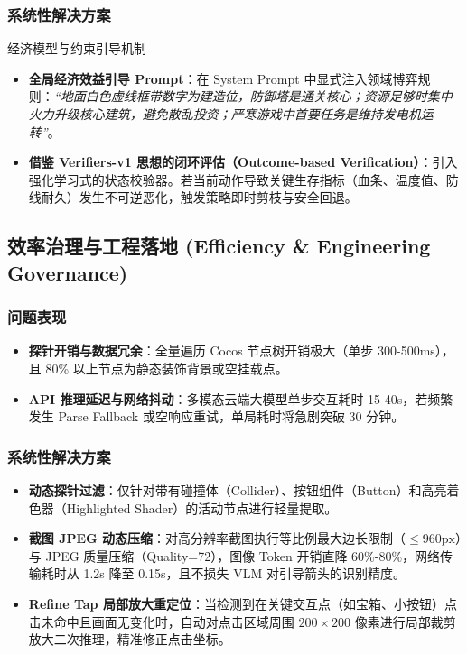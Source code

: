 \documentclass[11pt,a4paper]{ctexart}
\begin{document}
\subsubsection{系统性解决方案}
\begin{conceptbox}{经济模型与约束引导机制}
\begin{itemize}
  \item \textbf{全局经济效益引导 Prompt}：在 System Prompt 中显式注入领域博弈规则：\textit{“地面白色虚线框带数字为建造位，防御塔是通关核心；资源足够时集中火力升级核心建筑，避免散乱投资；严寒游戏中首要任务是维持发电机运转”}。
  \item \textbf{借鉴 Verifiers-v1 思想的闭环评估（Outcome-based Verification）}：引入强化学习式的状态校验器。若当前动作导致关键生存指标（血条、温度值、防线耐久）发生不可逆恶化，触发策略即时剪枝与安全回退。
\end{itemize}
\end{conceptbox}

\subsection{效率治理与工程落地 (Efficiency \& Engineering Governance)}

\subsubsection{问题表现}
\begin{itemize}
  \item \textbf{探针开销与数据冗余}：全量遍历 Cocos 节点树开销极大（单步 300-500ms），且 80\% 以上节点为静态装饰背景或空挂载点。
  \item \textbf{API 推理延迟与网络抖动}：多模态云端大模型单步交互耗时 15-40s，若频繁发生 Parse Fallback 或空响应重试，单局耗时将急剧突破 30 分钟。
\end{itemize}

\subsubsection{系统性解决方案}
\begin{itemize}
  \item \textbf{动态探针过滤}：仅针对带有碰撞体（Collider）、按钮组件（Button）和高亮着色器（Highlighted Shader）的活动节点进行轻量提取。
  \item \textbf{截图 JPEG 动态压缩}：对高分辨率截图执行等比例最大边长限制（$\le 960\text{px}$）与 JPEG 质量压缩（Quality=72），图像 Token 开销直降 60\%-80\%，网络传输耗时从 1.2s 降至 0.15s，且不损失 VLM 对引导箭头的识别精度。
  \item \textbf{Refine Tap 局部放大重定位}：当检测到在关键交互点（如宝箱、小按钮）点击未命中且画面无变化时，自动对点击区域周围 $200\times 200$ 像素进行局部裁剪放大二次推理，精准修正点击坐标。
\end{itemize}
\end{document}
